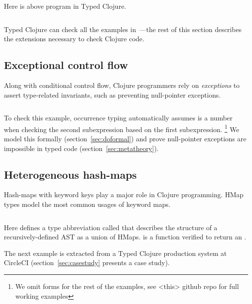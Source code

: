 Here is above program in Typed Clojure.

\begin{exmp}
\inputminted[firstline=1]{clojure}{code/demo/src/demo/eg1.clj}
\label{example:conditionalflow}
\end{exmp}

Typed Clojure can check all the examples in~\citet{TF10}---the 
rest of this section describes the extensions necessary
to check Clojure code.

\subsection{Exceptional control flow}

Along with conditional control flow,
Clojure programmers rely on \emph{exceptions}
to assert type-related invariants, such as preventing
null-pointer exceptions.

\begin{exmp}
\inputminted[firstline=13,lastline=15]{clojure}{code/demo/src/demo/do.clj}
\label{example:doexception}
\end{exmp}

To check this example,
occurrence typing 
automatically
assumes
 is a number when checking the second  subexpression
based on the first subexpression.
\footnote{We omit  forms for the rest of the examples, see <this> github repo for full working examples}
We model this formally (section~\ref{sec:doformal}) and prove
null-pointer exceptions are impossible in typed code (section~\ref{sec:metatheory}).

\subsection{Heterogeneous hash-maps}

Hash-maps with keyword keys play a major role in Clojure programming.
HMap types model the most common usages of keyword maps.

\begin{exmp}
\inputminted[firstline=6,lastline=13]{clojure}{code/demo/src/demo/hmap.clj}
\label{example:decleaf}
\end{exmp}

Here  defines a type abbreviation called 
that describes the structure of a recursively-defined AST as a union of HMaps.
 is a function verified to return an .

The next example is extracted from a Typed Clojure production system at CircleCI
(section~\ref{sec:casestudy} presents a case study).

